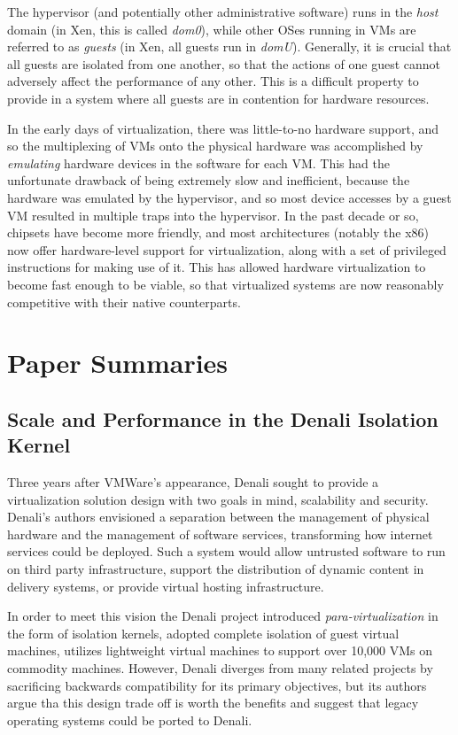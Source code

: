 \documentclass[letterpaper, twocolumn]{article}
\begin{document}
The hypervisor (and potentially other administrative software) runs in the \emph{host}
domain (in Xen, this is called \emph{dom0}), while other OSes running in VMs are 
referred to as \emph{guests} (in Xen, all guests run in \emph{domU}).  Generally, it is
crucial that all guests are isolated from one another, so that the actions of one guest
cannot adversely affect the performance of any other.  This is a difficult property
to provide in a system where all guests are in contention for hardware resources.

In the early days of virtualization, there was little-to-no hardware support,
and so the multiplexing of VMs onto the physical hardware was accomplished by
\emph{emulating} hardware devices in the software for each VM.  This had the unfortunate
drawback of being extremely slow and inefficient, because the hardware was emulated by
the hypervisor, and so most device accesses by a guest VM resulted in multiple traps
into the hypervisor.  In the past decade or so, chipsets have become more friendly,
and most architectures (notably the x86) now offer hardware-level support for
virtualization, along with a set of privileged instructions for making use of it.
This has allowed hardware virtualization to become fast enough to be viable,
so that virtualized systems are now reasonably competitive with their native
counterparts.

\section{Paper Summaries}
\label{sec:summaries}

\subsection{Scale and Performance in the Denali Isolation Kernel}
\label{sec:summaries/denali}

Three years after VMWare's appearance, Denali sought to provide a virtualization
solution design with two goals in mind, scalability and security. Denali's authors
envisioned a separation between the management of physical hardware and the management
of software services, transforming how internet services could be deployed. Such a system 
would allow untrusted software to run on third party infrastructure, support the distribution 
of dynamic content in delivery systems, or provide virtual hosting infrastructure.

In order to meet this vision the Denali project introduced \emph{para-virtualization} in the form 
of isolation kernels, adopted complete isolation of guest virtual machines, utilizes lightweight
virtual machines to support over 10,000 VMs on commodity machines. However, Denali diverges from many 
related projects by sacrificing backwards compatibility for its primary objectives, but its authors argue
tha this design trade off is worth the benefits and suggest that legacy operating systems could be
ported to Denali.
\end{document}
